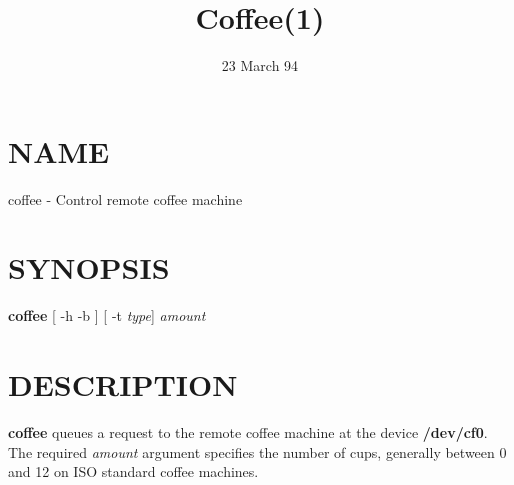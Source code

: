 \documentclass{article}
\title{Coffee(1)}
\date{23 March 94}
\begin{document}
\maketitle
\section{NAME}
coffee - Control remote coffee machine
\section{SYNOPSIS}
\textbf{coffee} [ -h \textbar -b ] [ -t \textit{type}]
\textit{amount}
\section{DESCRIPTION}
\textbf{coffee} queues a request to the remote
coffee machine at the device \textbf{/dev/cf0}.
The required \textit{amount} argument specifies
the number of cups, generally between 0 and
12 on ISO standard coffee machines.
\end{document}
